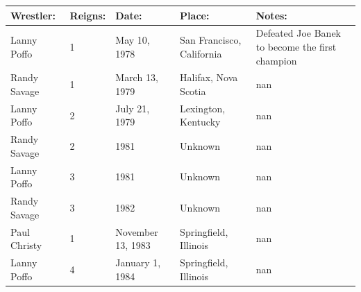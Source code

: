 \documentclass{article}
\begin{document}
\begin{tabular}{lllll}
\toprule
Wrestler: & Reigns: & Date: & Place: & Notes: \\
\midrule
Lanny Poffo & 1 & May 10, 1978 & San Francisco, California & Defeated Joe Banek to become the first champion \\
Randy Savage & 1 & March 13, 1979 & Halifax, Nova Scotia & nan \\
Lanny Poffo & 2 & July 21, 1979 & Lexington, Kentucky & nan \\
Randy Savage & 2 & 1981 & Unknown & nan \\
Lanny Poffo & 3 & 1981 & Unknown & nan \\
Randy Savage & 3 & 1982 & Unknown & nan \\
Paul Christy & 1 & November 13, 1983 & Springfield, Illinois & nan \\
Lanny Poffo & 4 & January 1, 1984 & Springfield, Illinois & nan \\
\bottomrule
\end{tabular}
\end{document}
